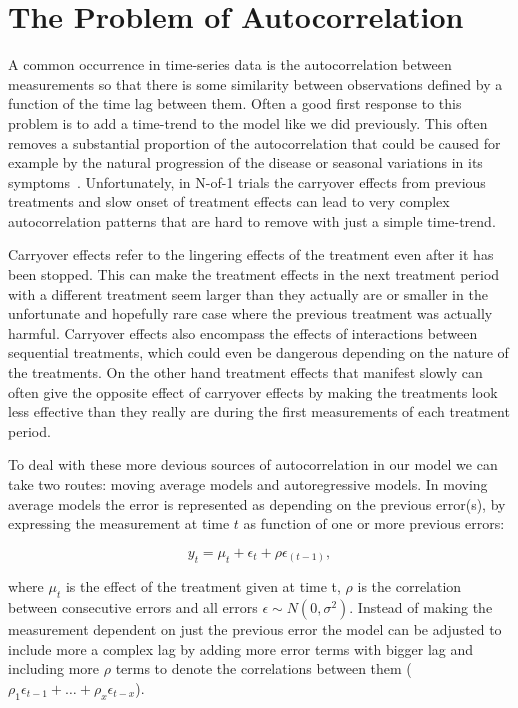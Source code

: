 \documentclass[12pt,a4paper,leqno]{report}
\theoremstyle{plain}
\theoremstyle{definition}
\theoremstyle{remark}
\begin{document}
\section{The Problem of Autocorrelation}\label{autocor}

A common occurrence in time-series data is the autocorrelation between
measurements so that there is some similarity between observations defined by a
function of the time lag between them. Often a good first response to this problem
is to add a time-trend to the model like we did previously. This
often removes a substantial proportion of the autocorrelation that could be
caused for example by the natural progression of the disease or seasonal variations
in its symptoms\ \cite{stat}. Unfortunately, in N-of-1 trials the carryover effects
from previous treatments and slow onset of treatment effects can lead to very
complex autocorrelation patterns that are hard to remove with just a simple time-trend.

Carryover effects refer to the lingering effects of the treatment even after it
has been stopped. This can make the treatment effects in the next treatment period
with a different treatment seem larger than they actually are or smaller in the
unfortunate and hopefully rare case where the previous treatment was actually
harmful. Carryover effects also encompass the effects of interactions between
sequential treatments, which could even be dangerous depending on the nature of
the treatments. On the other hand treatment effects that manifest slowly can
often give the opposite effect of carryover effects by making the treatments
look less effective than they really are during the first measurements of each
treatment period.\cite{stat}

To deal with these more devious sources of autocorrelation in our model we can
take two routes: moving average models and autoregressive models. In moving
average models the error is represented as depending on the previous error(s), by
expressing the measurement at time \(t\) as function of one or more previous
errors:

\begin{def}\label{}
    \begin{equation}\label{movingaverage}
        y_t = \mu_t + \epsilon_t + \rho\epsilon_{(t - 1)},
    \end{equation}
\end{def}where \(\mu_t\) is the effect of the treatment given at time t, \(\rho
\) is the correlation between consecutive errors and all errors \(\epsilon \sim
N(0,\sigma^2) \). Instead of making the measurement dependent on just the previous error the model
can be adjusted to include more a complex lag by adding more error terms with
bigger lag and including more \(\rho \) terms to denote the correlations between
them (\(\rho_1\epsilon_{t-1} + \ldots + \rho_x\epsilon_{t-x}\)).
\end{document}
